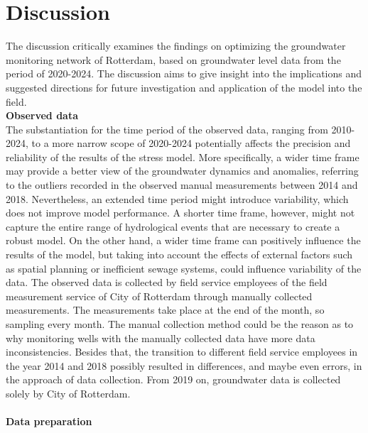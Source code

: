 \chapter{Discussion}                                                                                 
\label{chapter:discussion}
The discussion critically examines the findings on optimizing the groundwater monitoring network of Rotterdam, based on groundwater level data from the period of 2020-2024. The discussion aims to give insight into the implications and suggested directions for future investigation and application of the model into the field. \\
\newline
\noindent
\textbf{Observed data}\\
The substantiation for the time period of the observed data, ranging from 2010-2024, to a more narrow scope of 2020-2024 potentially affects the precision and reliability of the results of the stress model. More specifically, a wider time frame may provide a better view of the groundwater dynamics and anomalies, referring to the outliers recorded in the observed manual measurements between 2014 and 2018. Nevertheless, an extended time period might introduce variability, which does not improve model performance. A shorter time frame, however, might not capture the entire range of hydrological events that are necessary to create a robust model. On the other hand, a wider time frame can positively influence the results of the model, but taking into account the effects of external factors such as spatial planning or inefficient sewage systems, could influence variability of the data. The observed data is collected by field service employees of the field measurement service of City of Rotterdam through manually collected measurements. The measurements take place at the end of the month, so sampling every month. The manual collection method could be the reason as to why monitoring wells with the manually collected data have more data inconsistencies. Besides that, the transition to different field service employees in the year 2014 and 2018 possibly resulted in differences, and maybe even errors, in the approach of data collection. From 2019 on, groundwater data is collected solely by City of Rotterdam. \\
\\
\textbf{Data preparation}\\
